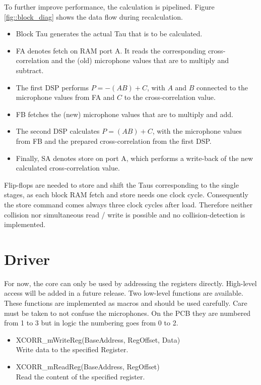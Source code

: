 To further improve performance, the calculation is pipelined.
Figure \ref{fig::block_diag} shows the data flow during recalculation.

\begin{itemize}
	\item Block Tau generates the actual Tau that is to be calculated.
	\item FA denotes fetch on RAM port A. It reads the corresponding cross-correlation and the (old) 	microphone values that are to multiply and subtract.	
	\item The first DSP performs $P = -(AB)+C$, with $A$ and $B$ connected to the microphone values from FA and $C$ to the cross-correlation value.
	\item FB fetches the (new) microphone values that are to multiply and add.
	\item The second DSP calculates $P = (AB)+C$, with the microphone values from FB and the prepared cross-correlation from the first DSP.
	\item Finally, SA denotes store on port A, which performs a write-back of the new calculated cross-correlation value.
\end{itemize}

Flip-flops are needed to store and shift the Taus corresponding to the single stages, as each block RAM fetch and store needs one clock cycle.
Consequently the store command comes always three clock cycles after load.
Therefore neither collision nor simultaneous read / write is possible and no collision-detection is implemented.

\section{Driver}
\label{sec::driver}

For now, the core can only be used by addressing the registers directly.
High-level access will be added in a future release.
Two low-level functions are available.
These functions are implemented as macros and should be used carefully.
Care must be taken to not confuse the microphones. 
On the PCB they are numbered from 1 to 3 but in logic the numbering goes from 0 to 2.

\begin{itemize}
	\item XCORR\_mWriteReg(BaseAddress, RegOffset, Data) \\
		Write data to the specified Register. 
	\item XCORR\_mReadReg(BaseAddress, RegOffset) \\		
		Read the content of the specified register.
\end{itemize}

